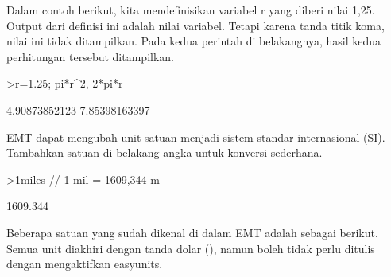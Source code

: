 \documentclass[a4paper,10pt]{article}
\begin{document}
\begin{eulernotebook}
\begin{eulercomment}
\begin{eulercomment}
\begin{eulercomment}
Dalam contoh berikut, kita mendefinisikan variabel r yang diberi nilai
1,25. Output dari definisi ini adalah nilai variabel. Tetapi karena
tanda titik koma, nilai ini tidak ditampilkan. Pada kedua perintah di
belakangnya, hasil kedua perhitungan tersebut ditampilkan.
\end{eulercomment}
\begin{eulerprompt}
>r=1.25; pi*r^2, 2*pi*r
\end{eulerprompt}
\begin{euleroutput}
  4.90873852123
  7.85398163397
\end{euleroutput}
\begin{eulercomment}
EMT dapat mengubah unit satuan menjadi sistem standar internasional
(SI). Tambahkan satuan di belakang angka untuk konversi sederhana.
\end{eulercomment}
\begin{eulerprompt}
>1miles  // 1 mil = 1609,344 m
\end{eulerprompt}
\begin{euleroutput}
  1609.344
\end{euleroutput}
\begin{eulercomment}
Beberapa satuan yang sudah dikenal di dalam EMT adalah sebagai
berikut. Semua unit diakhiri dengan tanda dolar (\textdollar{}), namun boleh tidak
perlu ditulis dengan mengaktifkan easyunits.


\end{eulercomment}
\end{eulercomment}
\end{eulercomment}
\end{eulernotebook}
\end{document}

